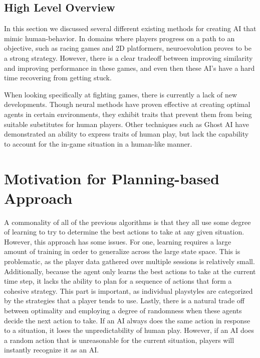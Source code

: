 \documentclass{article}
\begin{document}
\subsection{High Level Overview}
In this section we discussed several different existing methods for creating AI that mimic human-behavior. In domains where players progress on a path to an objective, such as racing games and 2D platformers, neuroevolution proves to be a strong strategy. However, there is a clear tradeoff between improving similarity and improving performance in these games, and even then these AI's have a hard time recovering from getting stuck. 

When looking specifically at fighting games, there is currently a lack of new developments. Though neural methods have proven effective at creating optimal agents in certain environments, they exhibit traits that prevent them from being suitable substitutes for human players. Other techniques such as Ghost AI have demonstrated an ability to express traits of human play, but lack the capability to account for the in-game situation in a human-like manner.


\section{Motivation for Planning-based Approach}
A commonality of all of the previous algorithms is that they all use some degree of learning to try to determine the best actions to take at any given situation. However, this approach has some issues. For one, learning requires a large amount of training in order to generalize across the large state space. This is problematic, as the player data gathered over multiple sessions is relatively small. Additionally, because the agent only learns the best actions to take at the current time step, it lacks the ability to plan for a sequence of actions that form a cohesive strategy. This part is important, as individual playstyles are categorized by the strategies that a player tends to use. Lastly, there is a natural trade off between optimality and employing a degree of randomness when these agents decide the next action to take. If an AI always does the same action in response to a situation, it loses the unpredictability of human play. However, if an AI does a random action that is unreasonable for the current situation, players will instantly recognize it as an AI. 
\end{document}
